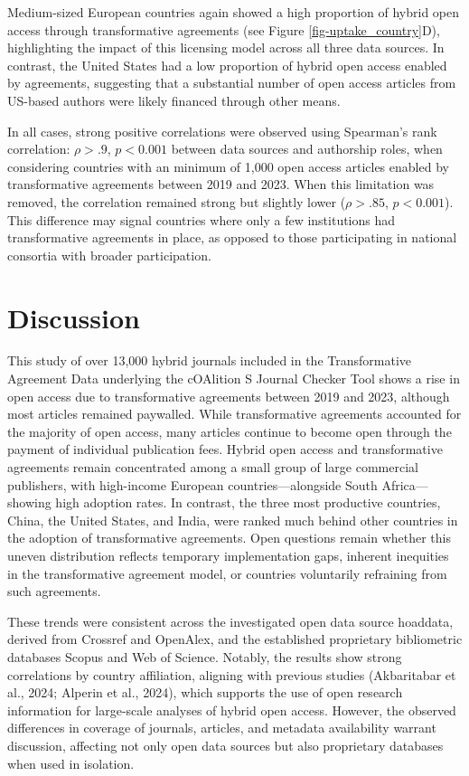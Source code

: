 \documentclass[a4paper,man,floatsintext,longtable,noextraspace,10pt]{apa6}
\begin{document}
Medium-sized European countries again showed a high proportion of hybrid
open access through transformative agreements (see Figure
\ref{fig-uptake_country}D), highlighting the impact of this licensing
model across all three data sources. In contrast, the United States had
a low proportion of hybrid open access enabled by agreements, suggesting
that a substantial number of open access articles from US-based authors
were likely financed through other means.

In all cases, strong positive correlations were observed using
Spearman's rank correlation: \(\rho > .9\), \(p < 0.001\) between data
sources and authorship roles, when considering countries with an minimum
of 1,000 open access articles enabled by transformative agreements
between 2019 and 2023. When this limitation was removed, the correlation
remained strong but slightly lower (\(\rho > .85\), \(p < 0.001\)). This
difference may signal countries where only a few institutions had
transformative agreements in place, as opposed to those participating in
national consortia with broader participation.

\section{Discussion}\label{discussion}

This study of over 13,000 hybrid journals included in the Transformative
Agreement Data underlying the cOAlition S Journal Checker Tool shows a
rise in open access due to transformative agreements between 2019 and
2023, although most articles remained paywalled. While transformative
agreements accounted for the majority of open access, many articles
continue to become open through the payment of individual publication
fees. Hybrid open access and transformative agreements remain
concentrated among a small group of large commercial publishers, with
high-income European countries---alongside South Africa---showing high
adoption rates. In contrast, the three most productive countries, China,
the United States, and India, were ranked much behind other countries in
the adoption of transformative agreements. Open questions remain whether
this uneven distribution reflects temporary implementation gaps,
inherent inequities in the transformative agreement model, or countries
voluntarily refraining from such agreements.

These trends were consistent across the investigated open data source
hoaddata, derived from Crossref and OpenAlex, and the established
proprietary bibliometric databases Scopus and Web of Science. Notably,
the results show strong correlations by country affiliation, aligning
with previous studies (Akbaritabar et al., 2024; Alperin et al., 2024),
which supports the use of open research information for large-scale
analyses of hybrid open access. However, the observed differences in
coverage of journals, articles, and metadata availability warrant
discussion, affecting not only open data sources but also proprietary
databases when used in isolation.
\end{document}
